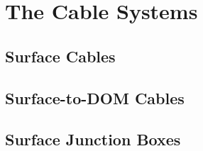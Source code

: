 
\section{The Cable Systems}
\subsection{Surface Cables}
\subsection{Surface-to-DOM Cables}
\subsection{Surface Junction Boxes}
